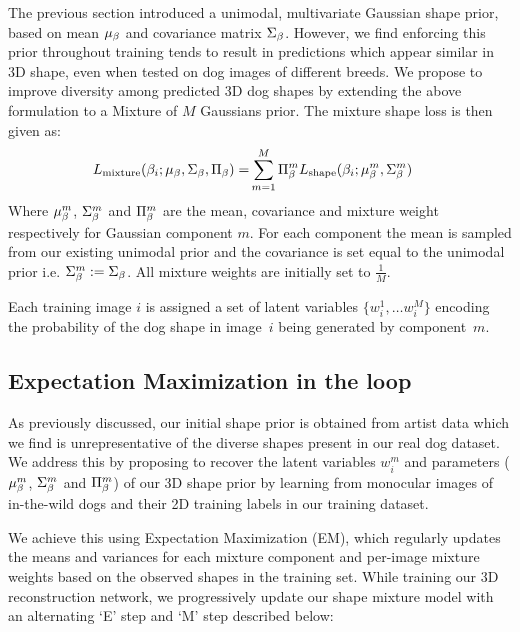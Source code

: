 The previous section introduced a unimodal, multivariate Gaussian shape prior, based on mean $\mu_{\beta}$ and covariance matrix $\Sigma_{\beta}$. However, we find enforcing this prior throughout training tends to result in predictions which appear similar in 3D shape, even when tested on dog images of different breeds. We propose to improve diversity among predicted 3D dog shapes by extending the above formulation to a Mixture of $M$ Gaussians prior.  
The mixture shape loss is then given as:
\begin{align}
    L_{\textrm{mixture}}(\beta_{i}; \mu_{\beta}, \Sigma_{\beta}, \Pi_{\beta})
    =&
    \sum_{m=1}^M \Pi_{\beta}^{m}L_{\textrm{shape}}(\beta_{i}; \mu_{\beta}^{m}, \Sigma_{\beta}^{m})
\end{align}
Where $\mu_{\beta}^{m}$, $\Sigma_{\beta}^{m}$ and $\Pi_{\beta}^{m}$ 
are the mean, covariance and mixture weight respectively for Gaussian component 
$m$. For each component the mean is sampled from our existing unimodal prior and the covariance is set equal to the unimodal prior i.e. $\Sigma_{\beta}^{m} := \Sigma_{\beta}$. All mixture weights are initially set to $\frac{1}{M}$.

Each training image $i$ is assigned a set of latent variables $\{w_{i}^{1}, \dots w_{i}^{M}\}$ encoding the probability of the dog shape in image~$i$ being generated by component~$m$. 

\subsection{Expectation Maximization in the loop}

As previously discussed, our initial shape prior is obtained from artist data which we find is unrepresentative of the diverse shapes present in our real dog dataset. We address this by proposing to recover the latent variables $w_{i}^{m}$ and parameters ($\mu_{\beta}^{m}$, $\Sigma_{\beta}^{m}$ and $\Pi_{\beta}^{m}$) of our 3D shape prior by learning from monocular images of in-the-wild dogs and their 2D training labels in our training dataset.

We achieve this using Expectation Maximization (EM), which regularly updates the means and variances for each mixture component and per-image mixture weights based on the observed shapes in the training set. While training our 3D reconstruction network, we progressively update our shape mixture model with an alternating `E' step and `M' step described below:

